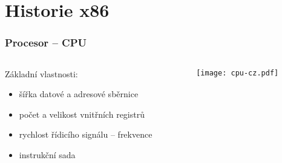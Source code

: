 \documentclass{beamer}
\subtitle{Lekce 11. Architektura x86}
\author{Petr Štěpán\\ \small\texttt{stepan@fel.cvut.cz}}
\begin{document}
\maketitle

\section{Historie x86}

\begin{frame}
\frametitle{Procesor -- CPU}
\begin{columns}[t,onlytextwidth]
\begin{column}{0.4\textwidth}
Základní vlastnosti:
  \begin{itemize}
    \item šířka datové a adresové sběrnice
    \item počet a velikost vnitřních registrů
    \item rychlost řídicího signálu – frekvence
    \item instrukční sada
  \end{itemize}
\end{column}
\begin{column}{0.52\textwidth}  
   \begin{center}
   \texttt{[image: cpu-cz.pdf]}
   \end{center}
\end{column}
\end{columns}
\end{frame}
\end{document}

